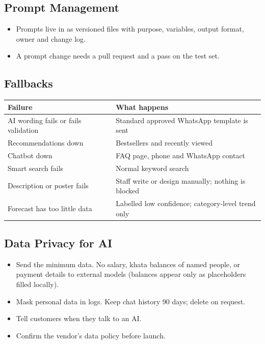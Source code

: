 \documentclass[11pt,a4paper]{article}
\newcommand{\code}[1]{\texttt{\detokenize{#1}}}
\newcommand{\hdr}{\rowcolor{hdrgray}\bfseries}
\begin{document}
\subsection{Prompt Management}
\begin{itemize}
\item Prompts live in \code{/ai/prompts/} as versioned files with purpose, variables, output format, owner and change log.
\item A prompt change needs a pull request and a pass on the test set.
\end{itemize}

\subsection{Fallbacks}
\begin{longtable}{L{6cm}L{10.5cm}}
\hdr Failure & What happens \\ \endhead
AI wording fails or fails validation & Standard approved WhatsApp template is sent \\
Recommendations down & Bestsellers and recently viewed \\
Chatbot down & FAQ page, phone and WhatsApp contact \\
Smart search fails & Normal keyword search \\
Description or poster fails & Staff write or design manually; nothing is blocked \\
Forecast has too little data & Labelled low confidence; category-level trend only \\
\end{longtable}

\subsection{Data Privacy for AI}
\begin{itemize}
\item Send the minimum data. No salary, khata balances of named people, or payment details to external models (balances appear only as placeholders filled locally).
\item Mask personal data in logs. Keep chat history 90 days; delete on request.
\item Tell customers when they talk to an AI.
\item Confirm the vendor's data policy before launch.
\end{itemize}
\end{document}
